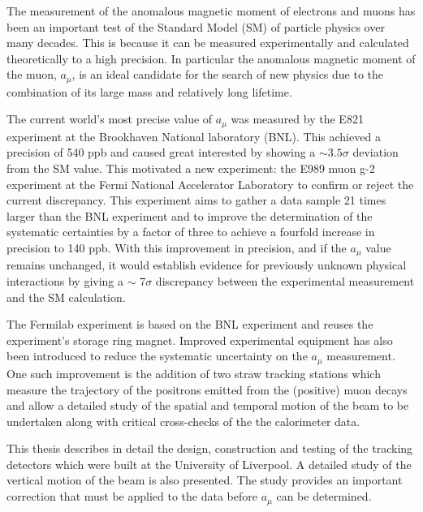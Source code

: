 The measurement of the anomalous magnetic moment of electrons and muons has been an important test of the Standard Model (SM) of particle physics over many decades. This is because it can be measured experimentally and calculated theoretically to a high precision. In particular the anomalous magnetic moment of the muon, $a_{\mu}$, is an ideal candidate for the search of new physics due to the combination of its large mass and relatively long lifetime.

The current world's most precise value of $a_{\mu}$ was measured by the E821 experiment at the Brookhaven National laboratory (BNL). This achieved a precision of 540 ppb and caused great interested by showing a $\sim 3.5\sigma$ deviation from the SM value. This motivated a new experiment: the E989 muon g-2 experiment at the Fermi National Accelerator Laboratory to confirm or reject the current discrepancy. This experiment aims to gather a data sample 21 times larger than the BNL experiment and to improve the determination of the systematic certainties by a factor of three to achieve a fourfold increase in precision to 140 ppb. With this improvement in precision, and if the $a_{\mu}$ value remains unchanged, it would establish evidence for previously unknown physical interactions by giving a $\sim$ 7$\sigma$ discrepancy between the experimental measurement and the SM calculation.

The Fermilab experiment is based on the BNL experiment and reuses the experiment’s storage ring magnet. Improved experimental equipment has also been introduced to reduce the systematic uncertainty on the $a_{\mu}$ measurement. One such improvement is the addition of two straw tracking stations which measure the trajectory of the positrons emitted from the (positive) muon decays and allow a detailed study of the spatial and temporal motion of the beam to be undertaken along with critical cross-checks of the the calorimeter data.

This thesis describes in detail the design, construction and testing of the tracking detectors which were built at the University of Liverpool. A detailed study of the vertical motion of the beam is also presented. The study provides an important correction that must be applied to the data before $a_\mu$  can be determined. 
